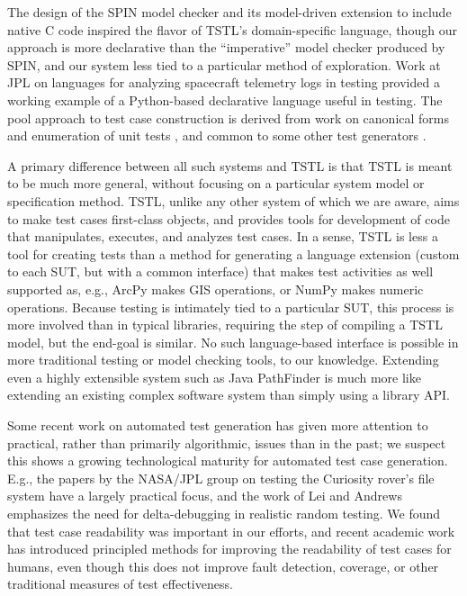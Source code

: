 The design of the SPIN model checker \cite{SPIN} and its model-driven
extension to include native C code \cite{ModelDriven} inspired the
flavor of TSTL's domain-specific language, though our approach is more
declarative than the ``imperative'' model checker produced by SPIN,
and our system less tied to a particular method of exploration.
Work at JPL on languages for analyzing spacecraft telemetry
logs in testing \cite{scriptstospecs} provided a working example of a
Python-based declarative language useful in testing.  The pool
approach to test case construction is derived from work on canonical
forms and enumeration of unit tests \cite{AndrewsTR}, and common to
some other test generators \cite{Pacheco}.

A primary difference between all such systems and TSTL is that TSTL is
meant to be much more general, without focusing on a particular system
model or specification method.  
TSTL, unlike any other system of which we are
aware, aims to make test cases first-class objects, and provides tools
for development of code that manipulates, executes, and analyzes test
cases.  In a sense, TSTL is less a tool for creating tests than a
method for generating a language extension (custom to each SUT, but
with a common interface) that makes test activities as well supported
as, e.g., ArcPy makes GIS operations, or NumPy makes numeric
operations.  Because testing is intimately tied to a particular SUT,
this process is more involved than in typical libraries, requiring the
step of compiling a TSTL model, but the end-goal is similar.  No such
language-based interface is possible in more traditional testing or
model checking tools, to our knowledge.  Extending even a highly
extensible system such as Java PathFinder \cite{JPF2} is much more
like extending an existing complex software system than simply using a
library API.

Some recent work on automated test generation has given more attention
to practical, rather than primarily algorithmic, issues than in the
past; we suspect this shows a growing technological maturity for
automated test case generation.  E.g., the papers by the NASA/JPL
group on testing the Curiosity rover's file system
\cite{ICSEDiff,CFV08,AMAI} have a largely practical focus, and the
work of Lei and Andrews \cite{MinUnit} emphasizes the need for
delta-debugging in realistic random testing.  We found that test case
readability was important in our efforts, and recent academic work
\cite{Readable,Guava} has introduced principled methods for improving
the readability of test cases for humans, even though this does not
improve fault detection, coverage, or other traditional measures of
test effectiveness.

